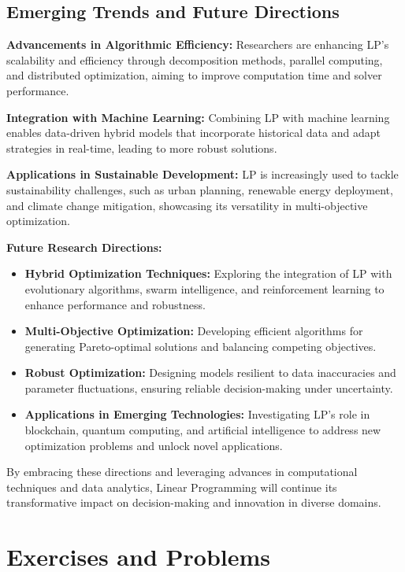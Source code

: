 \documentclass[12pt]{book} %
\begin{document}
\subsection{Emerging Trends and Future Directions}

\textbf{Advancements in Algorithmic Efficiency:} Researchers are enhancing LP's scalability and efficiency through decomposition methods, parallel computing, and distributed optimization, aiming to improve computation time and solver performance.

\textbf{Integration with Machine Learning:} Combining LP with machine learning enables data-driven hybrid models that incorporate historical data and adapt strategies in real-time, leading to more robust solutions.

\textbf{Applications in Sustainable Development:} LP is increasingly used to tackle sustainability challenges, such as urban planning, renewable energy deployment, and climate change mitigation, showcasing its versatility in multi-objective optimization.

\textbf{Future Research Directions:}

\begin{itemize}
    \item \textbf{Hybrid Optimization Techniques:} Exploring the integration of LP with evolutionary algorithms, swarm intelligence, and reinforcement learning to enhance performance and robustness.
    \item \textbf{Multi-Objective Optimization:} Developing efficient algorithms for generating Pareto-optimal solutions and balancing competing objectives.
    \item \textbf{Robust Optimization:} Designing models resilient to data inaccuracies and parameter fluctuations, ensuring reliable decision-making under uncertainty.
    \item \textbf{Applications in Emerging Technologies:} Investigating LP's role in blockchain, quantum computing, and artificial intelligence to address new optimization problems and unlock novel applications.
\end{itemize}

By embracing these directions and leveraging advances in computational techniques and data analytics, Linear Programming will continue its transformative impact on decision-making and innovation in diverse domains.


\section{Exercises and Problems}
\end{document}
